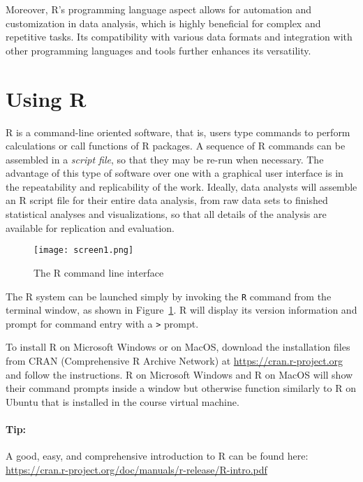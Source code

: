 Moreover, R's programming language aspect allows for automation and customization in data analysis, which is highly beneficial for complex and repetitive tasks. Its compatibility with various data formats and integration with other programming languages and tools further enhances its versatility.

\section{Using R}

R is a command-line oriented software, that is, users type commands to perform calculations or call functions of R packages. A sequence of R commands can be assembled in a \emph{script file}, so that they may be re-run when necessary. The advantage of this type of software over one with a graphical user interface is in the repeatability and replicability of the work. Ideally, data analysts will assemble an R script file for their entire data analysis, from raw data sets to finished statistical analyses and visualizations, so that all details of the analysis are available for replication and evaluation.

\begin{figure}
\centering
\texttt{[image: screen1.png]}
\caption{The R command line interface}
\label{fig:r}
\end{figure}

The R system can be launched simply by invoking the \texttt{R} command from the terminal window, as shown in Figure~\ref{fig:r}. R will display its version information and prompt for command entry with a \texttt{>} prompt. 

To install R on Microsoft Windows or on MacOS, download the installation files from CRAN (Comprehensive R Archive Network) at \url{https://cran.r-project.org} and follow the instructions. R on Microsoft Windows and R on MacOS will show their command prompts inside a window but otherwise function similarly to R on Ubuntu that is installed in the course virtual machine.

\begin{tcolorbox}[colback=alert]
\paragraph*{Tip:}
A good, easy, and comprehensive introduction to R can be found here: \url{https://cran.r-project.org/doc/manuals/r-release/R-intro.pdf}
\end{tcolorbox}

